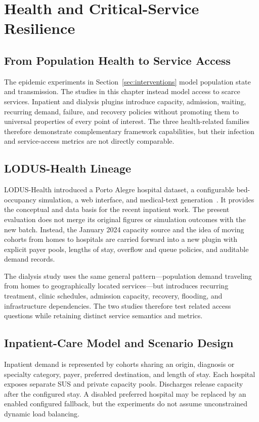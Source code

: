 \documentclass[pdflatex,sn-mathphys-num]{sn-jnl}%
\theoremstyle{thmstyleone}%
\theoremstyle{thmstyletwo}%
\theoremstyle{thmstylethree}%
\begin{document}
\section{Health and Critical-Service Resilience}
\label{sec:health_resilience}

\subsection{From Population Health to Service Access}

The epidemic experiments in Section~\ref{sec:interventions} model population state and transmission. The studies in this chapter instead model access to scarce services. Inpatient and dialysis plugins introduce capacity, admission, waiting, recurring demand, failure, and recovery policies without promoting them to universal properties of every point of interest. The three health-related families therefore demonstrate complementary framework capabilities, but their infection and service-access metrics are not directly comparable.

\subsection{LODUS-Health Lineage}
LODUS-Health introduced a Porto Alegre hospital dataset, a configurable bed-occupancy simulation, a web interface, and medical-text generation~\citep{souza2026lodushealth}. It provides the conceptual and data basis for the recent inpatient work. The present evaluation does not merge its original figures or simulation outcomes with the new batch. Instead, the January 2024 capacity source and the idea of moving cohorts from homes to hospitals are carried forward into a new plugin with explicit payer pools, lengths of stay, overflow and queue policies, and auditable demand records.

The dialysis study uses the same general pattern---population demand traveling from homes to geographically located services---but introduces recurring treatment, clinic schedules, admission capacity, recovery, flooding, and infrastructure dependencies. The two studies therefore test related access questions while retaining distinct service semantics and metrics.



\subsection{Inpatient-Care Model and Scenario Design}
Inpatient demand is represented by cohorts sharing an origin, diagnosis or specialty category, payer, preferred destination, and length of stay. Each hospital exposes separate SUS and private capacity pools. Discharges release capacity after the configured stay. A disabled preferred hospital may be replaced by an enabled configured fallback, but the experiments do not assume unconstrained dynamic load balancing.
\end{document}

